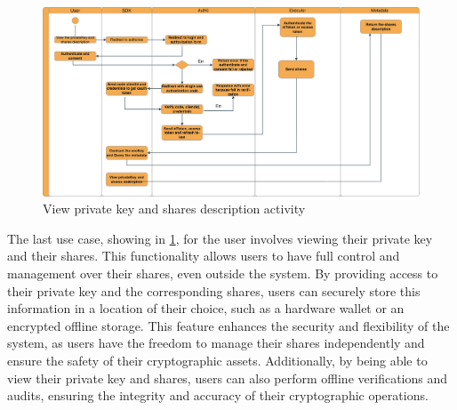 \documentclass[../Main.tex]{subfiles}
\begin{document}
\begin{figure}[H]
 \centering
 \includegraphics[scale=0.14]{Figure/view-pv-shares-activity.png}
 \caption{View private key and shares description activity}
    \label{fig:view-pv-shares-activity}
\end{figure}

The last use case, showing in \ref{fig:view-pv-shares-activity}, for the user involves viewing their private key and their shares. This functionality allows users to have full control and management over their shares, even outside the system. By providing access to their private key and the corresponding shares, users can securely store this information in a location of their choice, such as a hardware wallet or an encrypted offline storage. This feature enhances the security and flexibility of the system, as users have the freedom to manage their shares independently and ensure the safety of their cryptographic assets. Additionally, by being able to view their private key and shares, users can also perform offline verifications and audits, ensuring the integrity and accuracy of their cryptographic operations.
\end{document}
